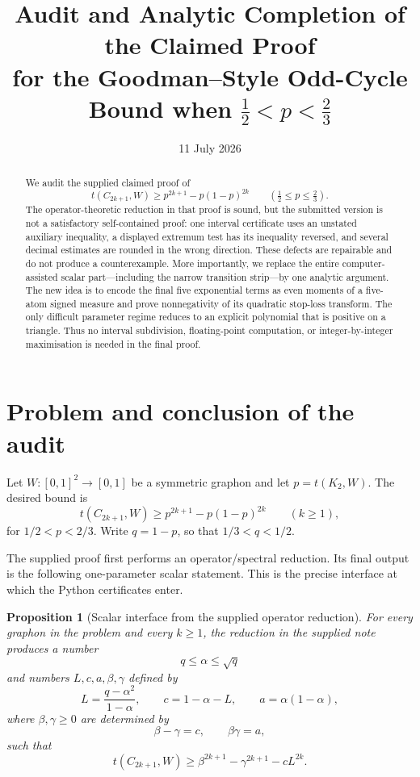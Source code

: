\documentclass[11pt]{article}
\title{Audit and Analytic Completion of the Claimed Proof\\
for the Goodman--Style Odd-Cycle Bound when $\tfrac12<p<\tfrac23$}
\author{}
\date{11 July 2026}
\newtheorem{proposition}[theorem]{Proposition}
\theoremstyle{remark}
\begin{document}
\maketitle

\begin{abstract}
We audit the supplied claimed proof of
\[
 t(C_{2k+1},W)\ge p^{2k+1}-p(1-p)^{2k}
 \qquad \left(\tfrac12\le p\le\tfrac23\right).
\]
The operator-theoretic reduction in that proof is sound, but the submitted
version is not a satisfactory self-contained proof: one interval certificate
uses an unstated auxiliary inequality, a displayed extremum test has its
inequality reversed, and several decimal estimates are rounded in the wrong
direction.  These defects are repairable and do not produce a counterexample.
More importantly, we replace the entire computer-assisted scalar part---including
the narrow transition strip---by one analytic argument.  The new idea is to
encode the final five exponential terms as even moments of a five-atom signed
measure and prove nonnegativity of its quadratic stop-loss transform.  The only
difficult parameter regime reduces to an explicit polynomial that is positive
on a triangle.  Thus no interval subdivision, floating-point computation, or
integer-by-integer maximisation is needed in the final proof.
\end{abstract}

\section{Problem and conclusion of the audit}

Let $W\colon[0,1]^2\to[0,1]$ be a symmetric graphon and let
$p=t(K_2,W)$.  The desired bound is
\begin{equation}\label{eq:graphon-goal}
 t(C_{2k+1},W)\ge p^{2k+1}-p(1-p)^{2k}
 \qquad(k\ge1),
\end{equation}
for $1/2<p<2/3$.  Write $q=1-p$, so that $1/3<q<1/2$.

The supplied proof first performs an operator/spectral reduction.  Its final
output is the following one-parameter scalar statement.  This is the precise
interface at which the Python certificates enter.

\begin{proposition}[Scalar interface from the supplied operator reduction]
\label{prop:interface}
For every graphon in the problem and every $k\ge1$, the reduction in the
supplied note produces a number
\[
 q\le \alpha\le\sqrt q
\]
and numbers $L,c,a,\beta,\gamma$ defined by
\begin{equation}\label{eq:parameters}
 L=\frac{q-\alpha^2}{1-\alpha},\qquad
 c=1-\alpha-L,\qquad
 a=\alpha(1-\alpha),
\end{equation}
where $\beta,\gamma\ge0$ are determined by
\begin{equation}\label{eq:roots}
 \beta-\gamma=c,\qquad \beta\gamma=a,
\end{equation}
such that
\begin{equation}\label{eq:operator-reduction}
 t(C_{2k+1},W)
 \ge \beta^{2k+1}-\gamma^{2k+1}-cL^{2k}.
\end{equation}
\end{proposition}
\end{document}
